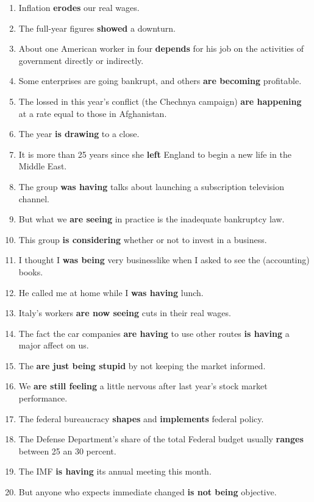 \documentclass[main.tex]{subfiles}
\begin{document}
\setcounter{secnumdepth}{0}

\setcounter{section}{102}

\setcounter{subsection}{1}


\begin{enumerate}[nosep,leftmargin=*]
	\itemsep\eitsp
	\item Inflation \textbf{erodes} our real wages.
	\item The full-year figures \textbf{showed} a downturn.
	\item About one American worker in four \textbf{depends} for his job on the activities of government directly or indirectly.
	\item Some enterprises are going bankrupt, and others \textbf{are becoming} profitable.
	\item The lossed in this year's conflict (the Chechnya campaign) \textbf{are happening} at a rate equal to those in Afghanistan.
	\item The year \textbf{is drawing} to a close.
	\item It is more than 25 years since she \textbf{left} England to begin a new life in the Middle East.
	\item The group \textbf{was having} talks about launching a subscription television channel.
	\item But what we \textbf{are seeing} in practice is the inadequate bankruptcy law.
	\item This group \textbf{is considering} whether or not to invest in a business.
	\item I thought I \textbf{was being} very businesslike when I asked to see the (accounting) books.
	\item He called me at home while I \textbf{was having} lunch.
	\item Italy's workers \textbf{are now seeing} cuts in their real wages.
	\item The fact the car companies \textbf{are having} to use other routes \textbf{is having} a major affect on us.
	\item The \textbf{are just being stupid} by not keeping the market informed.
	\item We \textbf{are still feeling} a little nervous after last year's stock market performance.
	\item The federal bureaucracy \textbf{shapes} and \textbf{implements} federal policy.
	\item The Defense Department's share of the total Federal budget usually \textbf{ranges} between 25 an 30 percent.
	\item The IMF \textbf{is having} its annual meeting this month.
	\item But anyone who expects immediate changed \textbf{is not being} objective.
\end{enumerate}
\ 
\end{document}
